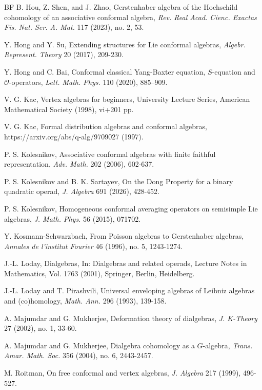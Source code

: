 \documentclass[a4paper,reqno,10pt]{amsart}
\theoremstyle{plain}
\theoremstyle{definition}
\theoremstyle{remark}
\begin{document}
\begin{thebibliography}{BF}
 B. Hou, Z. Shen, and J. Zhao, Gerstenhaber algebra of the Hochschild cohomology of an associative conformal algebra, {\em Rev. Real Acad. Cienc. Exactas Fis. Nat. Ser. A. Mat.} 117 (2023), no. 2, 53.

 Y. Hong and Y. Su, Extending structures for Lie conformal algebras, {\em Algebr. Represent. Theory} 20 (2017), 209-230.

 Y. Hong and C. Bai, Conformal classical Yang-Baxter equation, $S$-equation and $\mathcal{O}$-operators, {\em Lett. Math.
Phys.} 110 (2020), 885–909.


 V. G. Kac, Vertex algebras for beginners, University Lecture Series, American Mathematical Society (1998), vi+201 pp.

 V. G. Kac, Formal distribution algebras and conformal algebras, https://arxiv.org/abs/q-alg/9709027 (1997).

 P. S. Kolesnikov, Associative conformal algebras with finite faithful representation, {\em Adv. Math.} 202 (2006), 602-637.

 P. S. Kolesnikov and B. K. Sartayev, On the Dong Property for a binary quadratic operad, {\em J. Algebra} 691 (2026), 428-452.

 P. S. Kolesnikov, Homogeneous conformal averaging operators on semisimple Lie algebras, {\em J. Math. Phys.} 56 (2015), 071702.
  
 Y. Kosmann-Schwarzbach, From Poisson algebras to Gerstenhaber algebras, {\em Annales de l'institut Fourier} 46 (1996), no. 5, 1243-1274.


 J.-L. Loday, Dialgebras, In: {Dialgebras and related operads}, Lecture Notes in Mathematics, Vol. 1763 (2001), Springer, Berlin, Heidelberg.


 J.-L. Loday and T. Pirashvili, Universal enveloping algebras of Leibniz algebras and (co)homology, {\em Math. Ann.} 296 (1993), 139-158.


 A. Majumdar and G. Mukherjee, Deformation theory of dialgebras, {\em J. K-Theory} 27 (2002), no. 1, 33-60.

 A. Majumdar and G. Mukherjee, Dialgebra cohomology as a $G$-algebra, {\em Trans. Amar. Math. Soc.} 356 (2004), no. 6, 2443-2457.



 M. Roitman, On free conformal and vertex algebras, {\em J. Algebra} 217 (1999), 496-527.


\end{thebibliography}
\end{document}
